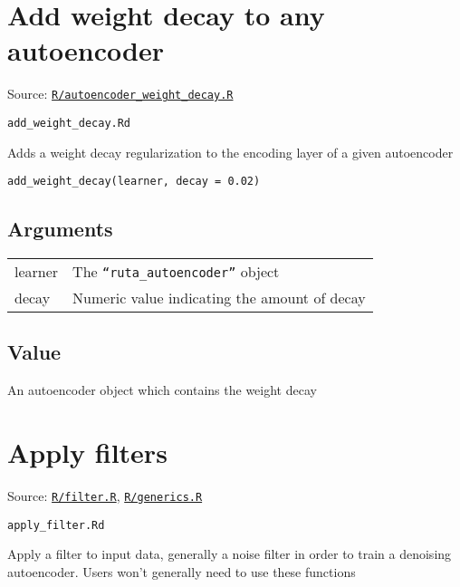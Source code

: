 \section{Add weight decay to any
autoencoder}\label{add-weight-decay-to-any-autoencoder}

Source:
\href{https://github.com/fdavidcl/ruta/blob/master/R/autoencoder_weight_decay.R}{\texttt{R/autoencoder\_weight\_decay.R}}

\texttt{add\_weight\_decay.Rd}

Adds a weight decay regularization to the encoding layer of a given
autoencoder

\begin{verbatim}
add_weight_decay(learner, decay = 0.02)
\end{verbatim}

\hypertarget{arguments}{\subsection{\texorpdfstring{\protect\hyperlink{arguments}{}Arguments}{Arguments}}\label{arguments}}

\begin{longtable}[c]{@{}>{\small}p{3cm}>{\raggedright}p{12.5cm}@{}}
\toprule
learner & The \texttt{``ruta\_autoencoder''} object\tabularnewline
decay & Numeric value indicating the amount of decay\tabularnewline
\bottomrule
\end{longtable}

\hypertarget{value}{\subsection{\texorpdfstring{\protect\hyperlink{value}{}Value}{Value}}\label{value}}

An autoencoder object which contains the weight decay

\section{Apply filters}\label{apply-filters}

Source:
\href{https://github.com/fdavidcl/ruta/blob/master/R/filter.R}{\texttt{R/filter.R}},
\href{https://github.com/fdavidcl/ruta/blob/master/R/generics.R}{\texttt{R/generics.R}}

\texttt{apply\_filter.Rd}

Apply a filter to input data, generally a noise filter in order to train
a denoising autoencoder. Users won't generally need to use these
functions

